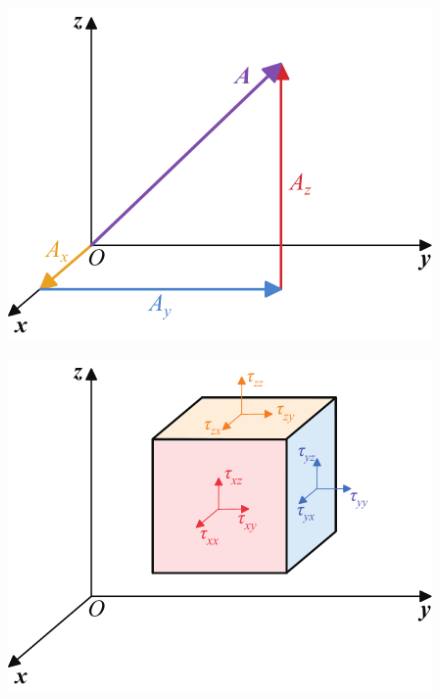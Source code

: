 \begin{figure}[!htb]
    \centering
    \begin{minipage}{0.49\linewidth}
        \centering
        \includegraphics[width=0.92\linewidth]{pic/一阶张量}
        \label{一阶张量}
    \end{minipage}
    \begin{minipage}{0.49\linewidth}
        \centering
        \includegraphics[width=0.92\linewidth]{pic/二阶张量}
        \label{二阶张量}
    \end{minipage}
\end{figure}
\newpage

\sssection[2阶张量]

